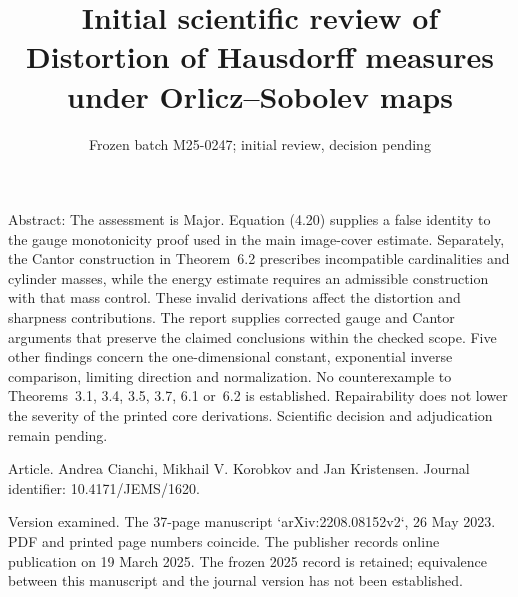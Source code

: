 \documentclass[10pt]{article}
\title{Initial scientific review of
Distortion of Hausdorff measures under
Orlicz–Sobolev maps}
\author{}
\date{Frozen batch M25-0247; initial review, decision pending}
\begin{document}
\maketitle
Abstract: The assessment is Major. Equation (4.20) supplies a false identity to the gauge monotonicity proof used in the main image-cover estimate. Separately, the Cantor construction in Theorem 6.2 prescribes incompatible cardinalities and cylinder masses, while the energy estimate requires an admissible construction with that mass control. These invalid derivations affect the distortion and sharpness contributions. The report supplies corrected gauge and Cantor arguments that preserve the claimed conclusions within the checked scope. Five other findings concern the one-dimensional constant, exponential inverse comparison, limiting direction and normalization. No counterexample to Theorems 3.1, 3.4, 3.5, 3.7, 6.1 or 6.2 is established. Repairability does not lower the severity of the printed core derivations. Scientific decision and adjudication remain pending.\par
Article. Andrea Cianchi, Mikhail V. Korobkov and Jan Kristensen. Journal identifier: 10.4171/JEMS/1620.\par
Version examined. The 37-page manuscript `arXiv:2208.08152v2`, 26 May 2023. PDF and printed page numbers coincide. The publisher records online publication on 19 March 2025. The frozen 2025 record is retained; equivalence between this manuscript and the journal version has not been established.\par
\end{document}
